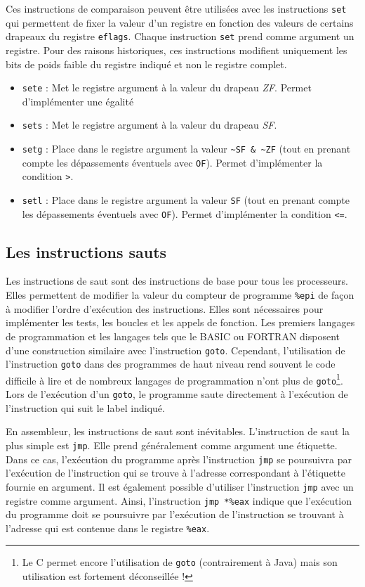 Ces instructions de comparaison peuvent être utilisées avec les instructions \texttt{set} qui permettent de fixer la valeur d'un registre en fonction des valeurs de certains drapeaux du registre \texttt{eflags}.
Chaque instruction \texttt{set} prend comme argument un registre.
Pour des raisons historiques, ces instructions modifient uniquement les bits de poids faible du registre indiqué et non le registre complet.
\begin{itemize}
  \item \texttt{sete} : Met le registre argument à la valeur du drapeau \textit{ZF}.
    Permet d'implémenter une égalité
  \item \texttt{sets} : Met le registre argument à la valeur du drapeau \textit{SF}.
  \item \texttt{setg} : Place dans le registre argument la valeur \texttt{\~{}SF \& \~{}ZF} (tout en prenant compte les dépassements éventuels avec \texttt{OF}).
    Permet d'implémenter la condition \texttt{>}.
  \item \texttt{setl} : Place dans le registre argument la valeur \texttt{SF} (tout en prenant compte les dépassements éventuels avec \texttt{OF}).
    Permet d'implémenter la condition \texttt{<=}.
\end{itemize}

\subsection{Les instructions sauts}
Les instructions de saut sont des instructions de base pour tous les processeurs.
Elles permettent de modifier la valeur du compteur de programme \texttt{\%epi} de façon à modifier l'ordre d'exécution des instructions.
Elles sont nécessaires pour implémenter les tests, les boucles et les appels de fonction.
Les premiers langages de programmation et les langages tels que le BASIC ou FORTRAN disposent d'une construction similaire avec l'instruction \texttt{goto}.
Cependant, l'utilisation de l'instruction \texttt{goto} dans des programmes de haut niveau rend souvent le code difficile à lire et de nombreux langages de programmation n'ont plus de \texttt{goto}\footnote{Le C permet encore l'utilisation de \texttt{goto} (contrairement à Java) mais son utilisation est fortement déconseillée !}.
Lors de l'exécution d'un \texttt{goto}, le programme saute directement à l'exécution de l'instruction qui suit le label indiqué.



En assembleur, les instructions de saut sont inévitables.
L'instruction de saut la plus simple est \texttt{jmp}.
Elle prend généralement comme argument une étiquette.
Dans ce cas, l'exécution du programme après l'instruction \texttt{jmp} se poursuivra par l'exécution de l'instruction qui se trouve à l'adresse correspondant à l'étiquette fournie en argument.
Il est également possible d'utiliser l'instruction \texttt{jmp} avec un registre comme argument.
Ainsi, l'instruction \texttt{jmp *\%eax} indique que l'exécution du programme doit se poursuivre par l'exécution de l'instruction se trouvant à l'adresse qui est contenue dans le registre \texttt{\%eax}.\\

